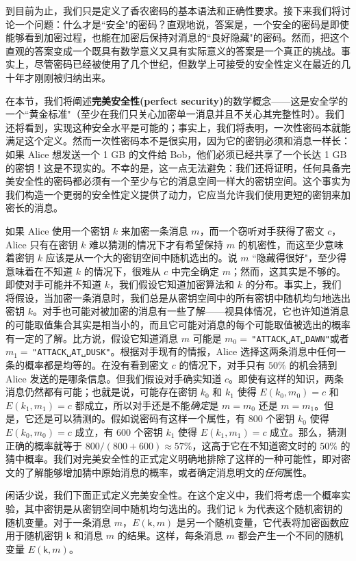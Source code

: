 到目前为止，我们只是定义了香农密码的基本语法和正确性要求。接下来我们将讨论一个问题：什么才是``安全"的密码？直观地说，答案是，一个安全的密码是即使能够看到加密过程，也能在加密后保持对消息的``良好隐藏"的密码。然而，把这个直观的答案变成一个既具有数学意义又具有实际意义的答案是一个真正的挑战。事实上，尽管密码已经被使用了几个世纪，但数学上可接受的安全性定义在最近的几十年才刚刚被归纳出来。

在本节，我们将阐述\textbf{完美安全性(perfect security)}的数学概念——这是安全学的一个``黄金标准"（至少在我们只关心加密单一消息并且不关心其完整性时）。我们还将看到，实现这种安全水平是可能的；事实上，我们将表明，一次性密码本就能满足这个定义。然而一次性密码本不是很实用，因为它的密钥必须和消息一样长：如果 Alice 想发送一个 1 GB 的文件给 Bob，他们必须已经共享了一个长达 1 GB 的密钥！这是不现实的。不幸的是，这一点无法避免：我们还将证明，任何具备完美安全性的密码都必须有一个至少与它的消息空间一样大的密钥空间。这个事实为我们构造一个更弱的安全性定义提供了动力，它应当允许我们使用更短的密钥来加密长的消息。

如果 Alice 使用一个密钥 $k$ 来加密一条消息 $m$，而一个窃听对手获得了密文 $c$，Alice 只有在密钥 $k$ 难以猜测的情况下才有希望保持 $m$ 的机密性，而这至少意味着密钥 $k$ 应该是从一个大的密钥空间中随机选出的。说 $m$ ``隐藏得很好"，至少得意味着在不知道 $k$ 的情况下，很难从 $c$ 中完全确定 $m$；然而，这其实是不够的。即使对手可能并不知道 $k$，我们假设它知道加密算法和 $k$ 的分布。事实上，我们将假设，当加密一条消息时，我们总是从密钥空间中的所有密钥中随机均匀地选出密钥 $k$。对手也可能对被加密的消息有一些了解——视具体情况，它也许知道消息的可能取值集合其实是相当小的，而且它可能对消息的每个可能取值被选出的概率有一定的了解。比方说，假设它知道消息 $m$ 可能是 $m_0=\,$\texttt{"ATTACK␣AT␣DAWN"}或者 $m_1=\,$\texttt{"ATTACK␣AT␣DUSK"}。根据对手现有的情报，Alice 选择这两条消息中任何一条的概率都是均等的。在没有看到密文 $c$ 的情况下，对手只有 $50\%$ 的机会猜到 Alice 发送的是哪条信息。但我们假设对手确实知道 $c$。即使有这样的知识，两条消息仍然都有可能；也就是说，可能存在密钥 $k_0$ 和 $k_1$ 使得 $E(k_0,m_0)=c$ 和 $E(k_1,m_1)=c$ 都成立，所以对手还是不能\emph{确定}是 $m=m_0$ 还是 $m=m_1$。但是，它还是可以猜测的。假如说密码有这样一个属性，有 $800$ 个密钥 $k_0$ 使得 $E(k_0,m_0)=c$ 成立，有 $600$ 个密钥 $k_1$ 使得 $E(k_1,m_1)=c$ 成立。那么，猜测正确的概率就等于 $800/(800+600)\approx57\%$，这高于它在不知道密文时的 $50\%$ 的猜中概率。我们对完美安全性的正式定义明确地排除了这样的一种可能性，即对密文的了解能够增加猜中原始消息的概率，或者确定消息明文的\emph{任何}属性。

闲话少说，我们下面正式定义完美安全性。在这个定义中，我们将考虑一个概率实验，其中密钥是从密钥空间中随机均匀选出的。我们记 $\boldsymbol{\mathsf{k}}$ 为代表这个随机密钥的随机变量。对于一条消息 $m$，$E(\boldsymbol{\mathsf{k}},m)$ 是另一个随机变量，它代表将加密函数应用于随机密钥 $\boldsymbol{\mathsf{k}}$ 和消息 $m$ 的结果。这样，每条消息 $m$ 都会产生一个不同的随机变量 $E(\boldsymbol{\mathsf{k}}, m)$。

